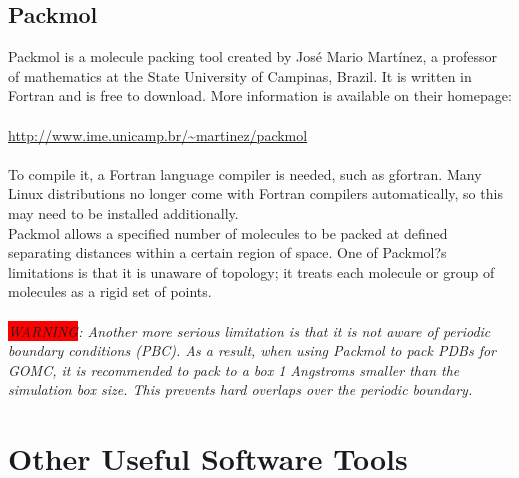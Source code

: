 \subsection{Packmol}
Packmol is a molecule packing tool created by Jos\'e Mario Mart\'inez, a professor of mathematics at the State University of Campinas, Brazil.  It is written in Fortran and is free to download.  More information is available on their homepage:\\\\
\url{http://www.ime.unicamp.br/~martinez/packmol}\\\\
To compile it, a Fortran language compiler is needed, such as gfortran.  Many Linux distributions no longer come with Fortran compilers automatically, so this may need to be installed additionally.\\
Packmol allows a specified number of molecules to be packed at defined separating distances within a certain region of space.  One of Packmol?s limitations is that it is unaware of topology; it treats each molecule or group of molecules as a rigid set of points.\\\\
\textit{\colorbox{red}{WARNING}: Another more serious limitation is that it is not aware of periodic boundary conditions (PBC).  As a result, when using Packmol to pack PDBs for GOMC, it is recommended to pack to a box 1 Angstroms smaller than the simulation box size.  This prevents hard overlaps over the periodic boundary.}

\section{Other Useful Software Tools}

